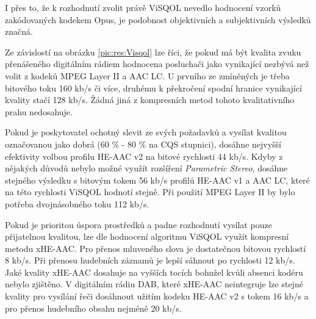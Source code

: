 \bigskip
\bigskip

I přes to, že k rozhodnutí zvolit právě ViSQOL nevedlo hodnocení vzorků zakódovaných kodekem Opus, je podobnost objektivních a subjektivních výsledků značná.


Ze závislostí na obrázku \ref{pic:res:Visqol} lze říci, že pokud má být kvalita zvuku přenášeného digitálním rádiem hodnocena posluchači jako vynikající nezbývá než volit z kodeků MPEG Layer II a AAC LC. U prvního ze zmíněných je třeba bitového toku 160 kb/s či více, druhému k překročení spodní hranice vynikající kvality stačí 128 kb/s. Žádná jiná z kompresních metod tohoto kvalitativního prahu nedosahuje. 

Pokud je poskytovatel ochotný slevit ze svých požadavků a vysílat kvalitou označovanou jako dobrá (60 \% - 80 \% na CQS stupnici), dosáhne nejvyšší efektivity volbou profilu HE-AAC v2 na bitové rychlosti 44 kb/s. Kdyby z nějakých důvodů nebylo možné využít rozšíření \textit{Parametric Stereo}, dosáhne stejného výsledku s bitovým tokem 56 kb/s profilů HE-AAC v1 a AAC LC, které na této rychlosti ViSQOL hodnotí stejně. Při použití MPEG Layer II by bylo potřeba dvojnásobného toku 112 kb/s. 

Pokud je prioritou úspora prostředků a padne rozhodnutí vysílat pouze přijatelnou kvalitou, lze dle hodnocení algoritmu ViSQOL využít kompresní metodu xHE-AAC. Pro přenos mluveného slova je dostatečnou bitovou rychlostí 8 kb/s. Při přenosu hudebních záznamů je lepší sáhnout po rychlosti 12 kb/s. Jaké kvality xHE-AAC dosahuje na vyšších tocích bohužel kvůli absenci kodéru nebylo zjištěno. V digitálním rádiu DAB, které xHE-AAC neintegruje lze stejné kvality pro vysílání řeči dosáhnout užitím kodeku HE-AAC v2 s tokem 16 kb/s a pro přenos hudebního obsahu nejméně 20 kb/s.



